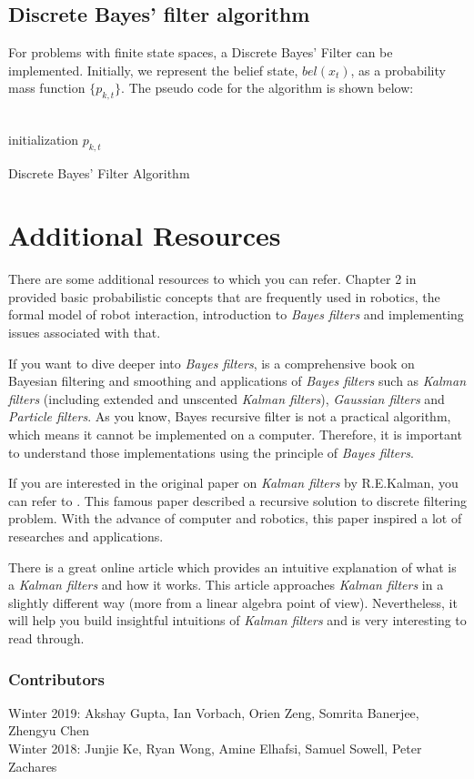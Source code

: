 \documentclass[twoside]{article}
\begin{document}
\subsection{Discrete Bayes' filter algorithm}

For problems with finite state spaces, a Discrete Bayes' Filter can be implemented. Initially, we represent the belief state, $bel(x_{t})$, as a probability mass function $\{p_{k,t}\}$. The pseudo code for the algorithm is shown below:
\\
\\
\begin{algorithm}[H]
 initialization\;
 \Return $p_{k,t}$
 \caption{Discrete Bayes' Filter Algorithm}
\end{algorithm}

\section{Additional Resources}

There are some additional resources to which you can refer. Chapter 2 in \cite{thrun2005probabilistic} provided basic probabilistic concepts that are frequently used in robotics, the formal model of robot interaction, introduction to \textit{Bayes filters} and implementing issues associated with that. 

If you want to dive deeper into \textit{Bayes filters}, \cite{sarkka2013bayesian} is a comprehensive book on Bayesian filtering and smoothing and applications of \textit{Bayes filters} such as \textit{Kalman filters} (including extended and unscented \textit{Kalman filters}), \textit{Gaussian filters} and \textit{Particle filters}. As you know, Bayes recursive filter is not a practical algorithm, which means it cannot be implemented on a computer. Therefore, it is important to understand those implementations using the principle of \textit{Bayes filters}. 

If you are interested in the original paper on \textit{Kalman filters} by R.E.Kalman, you can refer to \cite{kalman1960new}. This famous paper described a recursive solution to discrete filtering problem. With the advance of computer and robotics, this paper inspired a lot of researches and applications. 

There is a great online article \cite{HowKF} which provides an intuitive explanation of what is a \textit{Kalman filters} and how it works. This article approaches \textit{Kalman filters} in a slightly different way (more from a linear algebra point of view). Nevertheless, it will help you build insightful intuitions of \textit{Kalman filters} and is very interesting to read through.





\subsubsection*{Contributors}
Winter 2019: Akshay Gupta, Ian Vorbach, Orien Zeng, Somrita Banerjee, Zhengyu Chen
\\
Winter 2018: Junjie Ke, Ryan Wong, Amine Elhafsi, Samuel Sowell, Peter Zachares
\end{document}

